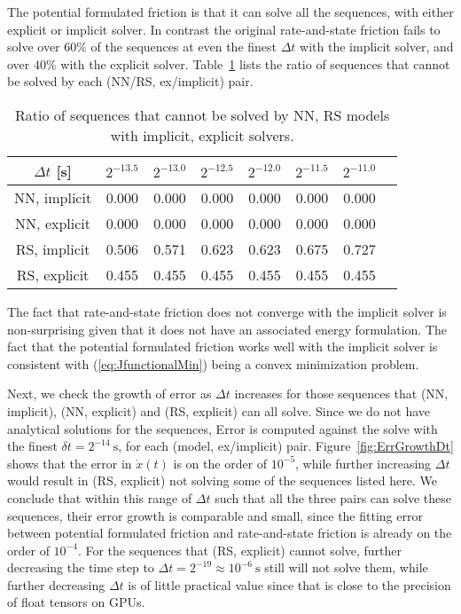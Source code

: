 The potential formulated friction is that it can solve all the sequences, 
with either explicit or implicit solver.  
In contrast the original rate-and-state friction fails to solve over $60\%$ of the sequences at even the finest $\Delta t$ with the implicit solver, 
and over $40\%$ with the explicit solver. 
Table~\ref{tab:NaNRatioSpringSliderRsVsNNRespective} lists the ratio of sequences that cannot be solved by each (NN/RS, ex/implicit) pair. 

\begin{table}[htb!]
    \centering
    \begin{tabular}{cccccccc}
        \hline
        $\Delta t$ [s] & $2^{-13.5}$ & $2^{-13.0}$ & $2^{-12.5}$ & $2^{-12.0}$ & $2^{-11.5}$ & $2^{-11.0}$ \\
        \hline
        NN, implicit & 0.000 & 0.000 & 0.000 & 0.000 & 0.000 & 0.000 \\
        NN, explicit & 0.000 & 0.000 & 0.000 & 0.000 & 0.000 & 0.000 \\
        RS, implicit & 0.506 & 0.571 & 0.623 & 0.623 & 0.675 & 0.727 \\
        RS, explicit & 0.455 & 0.455 & 0.455 & 0.455 & 0.455 & 0.455 \\
        \hline
    \end{tabular}
    \caption{Ratio of sequences that cannot be solved by NN, RS models with implicit, explicit solvers.}
    \label{tab:NaNRatioSpringSliderRsVsNNRespective}
\end{table}

The fact that rate-and-state friction does not converge with the implicit solver is non-surprising given that it does not have an associated energy formulation. 
The fact that the potential formulated friction works well with the implicit solver is consistent with (\ref{eq:JfunctionalMin}) being a convex minimization problem. 

Next, 
we check the growth of error as $\Delta t$ increases for those sequences that (NN, implicit), (NN, explicit) and (RS, explicit) can all solve. 
Since we do not have analytical solutions for the sequences, 
Error is computed against the solve with the finest $\delta t = 2^{-14}\ \mathrm{s}$, for each (model, ex/implicit) pair. 
Figure~\ref{fig:ErrGrowthDt} shows that the error in $\dot{x}(t)$ is on the order of $10^{-5}$, 
while further increasing $\Delta t$ would result in (RS, explicit) not solving some of the sequences listed here. 
We conclude that within this range of $\Delta t$ such that all the three pairs can solve these sequences, 
their error growth is comparable and small, 
since the fitting error between potential formulated friction and rate-and-state friction is already on the order of $10^{-4}$. 
For the sequences that (RS, explicit) cannot solve, 
further decreasing the time step to $\Delta t = 2^{-19}\approx 10^{-6}\ \mathrm{s}$ still will not solve them, 
while further decreasing $\Delta t$ is of little practical value since that is close to the precision of float tensors on GPUs. 

